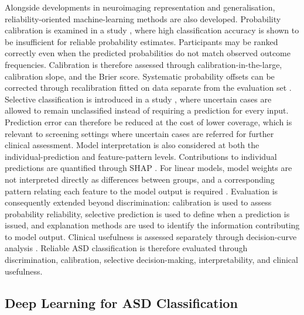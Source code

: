 Alongside developments in neuroimaging representation and generalisation, reliability-oriented machine-learning methods are also developed. Probability calibration is examined in a study \citep{Guoetal2017}, where high classification accuracy is shown to be insufficient for reliable probability estimates. Participants may be ranked correctly even when the predicted probabilities do not match observed outcome frequencies. Calibration is therefore assessed through calibration-in-the-large, calibration slope, and the Brier score. Systematic probability offsets can be corrected through recalibration fitted on data separate from the evaluation set \citep{VanCalsteretal2019,Steyerbergetal2010,ZadroznyElkan2002}. Selective classification is introduced in a study \citep{GeifmanElYaniv2017}, where uncertain cases are allowed to remain unclassified instead of requiring a prediction for every input. Prediction error can therefore be reduced at the cost of lower coverage, which is relevant to screening settings where uncertain cases are referred for further clinical assessment. Model interpretation is also considered at both the individual-prediction and feature-pattern levels. Contributions to individual predictions are quantified through SHAP \citep{LundbergLee2017}. For linear models, model weights are not interpreted directly as differences between groups, and a corresponding pattern relating each feature to the model output is required \citep{Haufeetal2014}. Evaluation is consequently extended beyond discrimination: calibration is used to assess probability reliability, selective prediction is used to define when a prediction is issued, and explanation methods are used to identify the information contributing to model output. Clinical usefulness is assessed separately through decision-curve analysis \citep{VanCalsteretal2018}. Reliable ASD classification is therefore evaluated through discrimination, calibration, selective decision-making, interpretability, and clinical usefulness.



\subsection{Deep Learning for ASD Classification}

